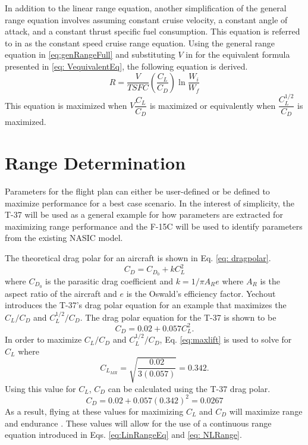 In addition to the linear range equation, another simplification of the general range equation involves assuming constant cruise velocity, a constant angle of attack, and a constant thrust specific fuel consumption. This equation is referred to in \cite{IntroACMechanics} as the constant speed cruise range equation. Using the general range equation in \ref{eq:genRangeFull} and substituting $V$ in for the equivalent formula presented in \ref{eq: VequivalentEq}, the following equation is derived.
\begin{equation}
    R = \dfrac{V}{TSFC}\left(\dfrac{C_L}{C_D}\right)\ln{\dfrac{W_i}{W_f}}
    \label{eq: NLRange}
\end{equation}
This equation is maximized when $V\dfrac{C_L}{C_D}$ is maximized or equivalently when $\dfrac{C_L^{1/2}}{C_D}$ is maximized.

\section{Range Determination}
Parameters for the flight plan can either be user-defined or be defined to maximize performance for a best case scenario. In the interest of simplicity, the T-37 will be used as a general example for how parameters are extracted for maximizing range performance and the F-15C will be used to identify parameters from the existing NASIC model. \par
The theoretical drag polar for an aircraft is shown in Eq. \ref{eq: dragpolar}.
\begin{equation}
    C_D = C_{D_0} + kC_L^2
    \label{eq: dragpolar}
\end{equation}
where $C_{D_0}$ is the parasitic drag coefficient and $k = 1/\pi A_Re$ where $A_R$ is the aspect ratio of the aircraft and $e$ is the Oswald's efficiency factor. Yechout \cite{IntroACMechanics} introduces the T-37's drag polar equation for an example that maximizes the $C_L/C_D$ and $C_L^{1/2}/C_D$. The drag polar equation for the T-37 is shown to be  
\begin{equation*}
    C_D = 0.02 + 0.057C_L^2.
\end{equation*}
In order to maximize $C_L/C_D$ and $C_L^{1/2}/C_D$, Eq. \ref{eq:maxlift} is used to solve for $C_L$ where
\begin{equation*}
    C_{L_{MR}} = \sqrt{\dfrac{0.02}{3(0.057)}} = 0.342.
\end{equation*}
Using this value for $C_L$, $C_D$ can be calculated using the T-37 drag polar.
\begin{equation*}
    C_D = 0.02 + 0.057(0.342)^2 = 0.0267
\end{equation*}
As a result, flying at these values for maximizing $C_L$ and $C_D$ will maximize range and endurance \cite{IntrotoAero}. These values will allow for the use of a continuous range equation introduced in Eqs. \ref{eq:LinRangeEq} and \ref{eq: NLRange}. \par
